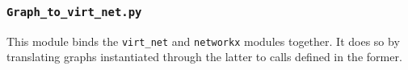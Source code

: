 \subsubsection{\texttt{Graph\_to\_virt\_net.py}}
    This module binds the \texttt{virt\_net} and \texttt{networkx} modules together. It does so by translating graphs instantiated through the latter to calls defined in the former.